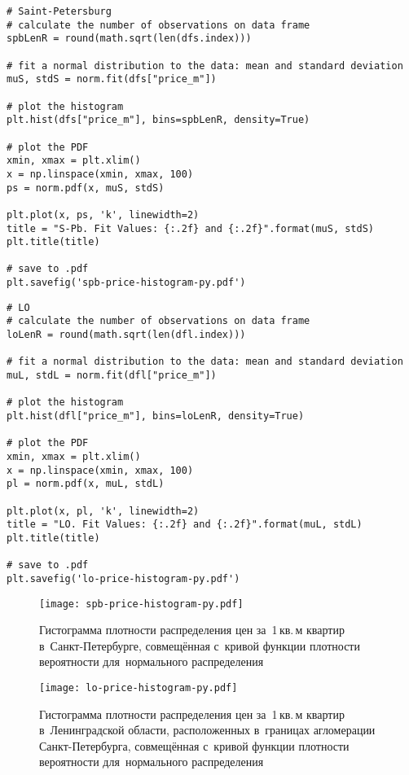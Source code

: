 \documentclass[]{scrartcl}
\begin{document}
%
\begin{lstlisting}[float, caption = Построение гистограммы для~Санкт-Петербурга, firstnumber=1, label= lst:price-hist-spb]
# Saint-Petersburg
# calculate the number of observations on data frame
spbLenR = round(math.sqrt(len(dfs.index)))

# fit a normal distribution to the data: mean and standard deviation
muS, stdS = norm.fit(dfs["price_m"])

# plot the histogram
plt.hist(dfs["price_m"], bins=spbLenR, density=True)

# plot the PDF
xmin, xmax = plt.xlim()
x = np.linspace(xmin, xmax, 100)
ps = norm.pdf(x, muS, stdS)

plt.plot(x, ps, 'k', linewidth=2)
title = "S-Pb. Fit Values: {:.2f} and {:.2f}".format(muS, stdS)
plt.title(title)

# save to .pdf
plt.savefig('spb-price-histogram-py.pdf')
\end{lstlisting}
%
\begin{lstlisting}[float, caption = Построение гистограммы для~Ленингадской области, firstnumber=1, label= lst:price-hist-lo]
# LO
# calculate the number of observations on data frame
loLenR = round(math.sqrt(len(dfl.index)))

# fit a normal distribution to the data: mean and standard deviation
muL, stdL = norm.fit(dfl["price_m"])

# plot the histogram
plt.hist(dfl["price_m"], bins=loLenR, density=True)

# plot the PDF
xmin, xmax = plt.xlim()
x = np.linspace(xmin, xmax, 100)
pl = norm.pdf(x, muL, stdL)

plt.plot(x, pl, 'k', linewidth=2)
title = "LO. Fit Values: {:.2f} and {:.2f}".format(muL, stdL)
plt.title(title)

# save to .pdf
plt.savefig('lo-price-histogram-py.pdf')
\end{lstlisting} 
%
\begin{figure}[ht]
	\centering
	\texttt{[image: spb-price-histogram-py.pdf]}
	\caption{Гистограмма плотности распределения цен за~1\,кв.\,м квартир в~Санкт-Петербурге, совмещённая с~кривой функции плотности вероятности для~нормального распределения}
	\label{fig:spb-prices-hist}
\end{figure}
%
\begin{figure}[ht]
	\centering
	\texttt{[image: lo-price-histogram-py.pdf]}
	\caption{Гистограмма плотности распределения цен за~1\,кв.\,м квартир в~Ленинградской области, расположенных в~границах агломерации Санкт-Петербурга, совмещённая с~кривой функции плотности вероятности для~нормального распределения}
	\label{fig:lo-prices-hist}
\end{figure}
%
\end{document}
